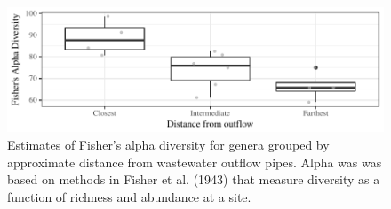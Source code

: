 \documentclass[letterpaper,12pt]{article}\usepackage[]{graphicx}\usepackage[]{color}
\makeatletter
\def\maxwidth{ %
  \ifdim\Gin@nat@width>\linewidth
    \linewidth
  \else
    \Gin@nat@width
  \fi
}
\newenvironment{knitrout}{}{} %
\makeatother
\begin{document}
\clearpage
\begin{knitrout}
\color{fgcolor}\begin{figure}[!ht]

{\centering \includegraphics[width=\maxwidth]{figs/boxdivcont} 

}

\caption[Estimates of Fisher's alpha diversity for genera grouped by approximate distance from wastewater outflow pipes]{Estimates of Fisher's alpha diversity for genera grouped by approximate distance from wastewater outflow pipes. Alpha was was based on methods in Fisher et al. (1943) that measure diversity as a function of richness and abundance at a site.}\label{fig:boxdivcont}
\end{figure}


\end{knitrout}
\end{document}
